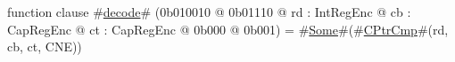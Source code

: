 function clause #\hyperref[zdecode]{decode}# (0b010010 @ 0b01110 @ rd : IntRegEnc @ cb : CapRegEnc @ ct : CapRegEnc @ 0b000 @ 0b001) = #\hyperref[zSome]{Some}#(#\hyperref[zCPtrCmp]{CPtrCmp}#(rd, cb, ct, CNE))
